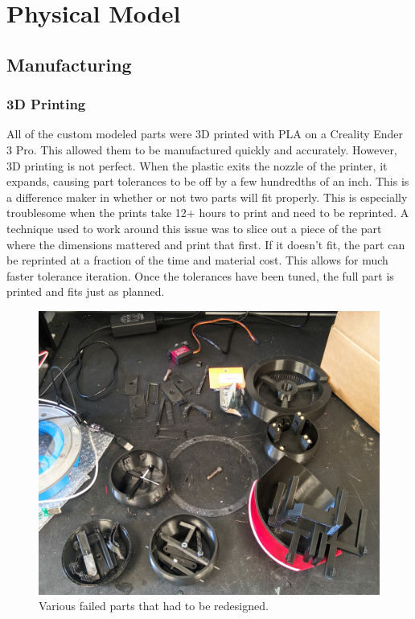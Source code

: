 \chapter{Physical Model}
\section{Manufacturing}
\subsection{3D Printing}

All of the custom modeled parts were 3D printed with PLA on a Creality Ender 3 Pro. This allowed them to be manufactured quickly and accurately. However, 3D printing is not perfect. When the plastic exits the nozzle of the printer, it expands, causing part tolerances to be off by a few hundredths of an inch. This is a difference maker in whether or not two parts will fit properly. This is especially troublesome when the prints take 12+ hours to print and need to be reprinted. A technique used to work around this issue was to slice out a piece of the part where the dimensions mattered and print that first. If it doesn't fit, the part can be reprinted at a fraction of the time and material cost. This allows for much faster tolerance iteration. Once the tolerances have been tuned, the full part is printed and fits just as planned.
\begin{figure}[h]
    \centering
    \includegraphics[width=0.5\linewidth]{Thesis/ch3/scrap.jpg}
    \caption{Various failed parts that had to be redesigned.}
    \label{fig:trash-parts}
\end{figure}
